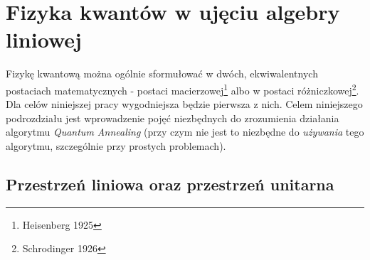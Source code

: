 \documentclass[12pt,a4paper,twoside,openany]{book}
\begin{document}
\section{Fizyka kwantów w ujęciu algebry liniowej}

Fizykę kwantową można ogólnie sformułować w dwóch, ekwiwalentnych postaciach matematycznych - postaci macierzowej\footnote{Heisenberg 1925} albo w postaci różniczkowej\footnote{Schrodinger 1926}. Dla celów niniejszej pracy wygodniejsza będzie pierwsza z nich. Celem niniejszego podrozdziału jest wprowadzenie pojęć niezbędnych do zrozumienia działania algorytmu \textit{Quantum Annealing} (przy czym nie jest to niezbędne do \textit{używania} tego algorytmu, szczególnie przy prostych problemach). 

\subsection{Przestrzeń liniowa oraz przestrzeń unitarna}
\end{document}
